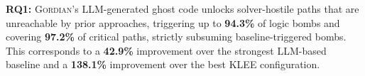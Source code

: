 \documentclass[acmsmall,screen,nonacm]{acmart}
\newcommand{\projName}{\textsc{Gordian}\xspace}
\theoremstyle{definition}
\begin{document}
\begin{tcolorbox}[
    colback=gray!5,
    colframe=black!20,
    arc=2pt,
    boxrule=0.3mm,
    sharp corners,
    left=2pt,
    right=2pt,
    top=2pt,
    bottom=2pt,
]
\textbf{RQ1:} \projName{}'s LLM-generated ghost code unlocks solver-hostile paths that are unreachable by prior approaches, triggering up to \textbf{94.3\%} of logic bombs and covering \textbf{97.2\%} of critical paths, strictly subsuming baseline-triggered bombs. This corresponds to a \textbf{42.9\%} improvement over the strongest LLM-based baseline and a \textbf{138.1\%} improvement over the best KLEE configuration.
\end{tcolorbox}




\end{document}
